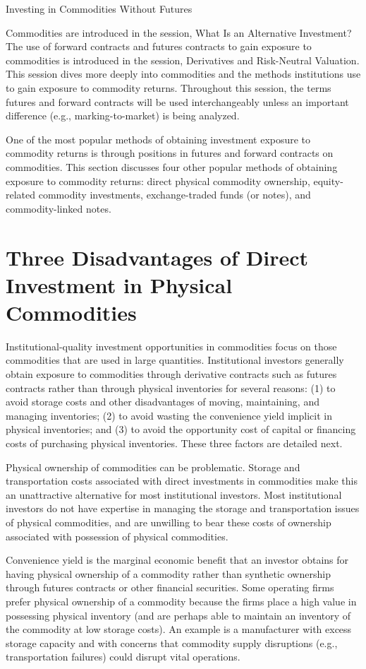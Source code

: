 \documentclass[11pt]{article}
\begin{document}
Investing in Commodities Without Futures

Commodities are introduced in the session, What Is an Alternative Investment? The use of forward contracts and futures contracts to gain exposure to commodities is introduced in the session, Derivatives and Risk-Neutral Valuation. This session dives more deeply into commodities and the methods institutions use to gain exposure to commodity returns. Throughout this session, the terms futures and forward contracts will be used interchangeably unless an important difference (e.g., marking-to-market) is being analyzed.

One of the most popular methods of obtaining investment exposure to commodity returns is through positions in futures and forward contracts on commodities. This section discusses four other popular methods of obtaining exposure to commodity returns: direct physical commodity ownership, equity-related commodity investments, exchange-traded funds (or notes), and commodity-linked notes.

\section*{Three Disadvantages of Direct Investment in Physical Commodities}
Institutional-quality investment opportunities in commodities focus on those commodities that are used in large quantities. Institutional investors generally obtain exposure to commodities through derivative contracts such as futures contracts rather than through physical inventories for several reasons: (1) to avoid storage costs and other disadvantages of moving, maintaining, and managing inventories; (2) to avoid wasting the convenience yield implicit in physical inventories; and (3) to avoid the opportunity cost of capital or financing costs of purchasing physical inventories. These three factors are detailed next.

Physical ownership of commodities can be problematic. Storage and transportation costs associated with direct investments in commodities make this an unattractive alternative for most institutional investors. Most institutional investors do not have expertise in managing the storage and transportation issues of physical commodities, and are unwilling to bear these costs of ownership associated with possession of physical commodities.

Convenience yield is the marginal economic benefit that an investor obtains for having physical ownership of a commodity rather than synthetic ownership through futures contracts or other financial securities. Some operating firms prefer physical ownership of a commodity because the firms place a high value in possessing physical inventory (and are perhaps able to maintain an inventory of the commodity at low storage costs). An example is a manufacturer with excess storage capacity and with concerns that commodity supply disruptions (e.g., transportation failures) could disrupt vital operations.
\end{document}
